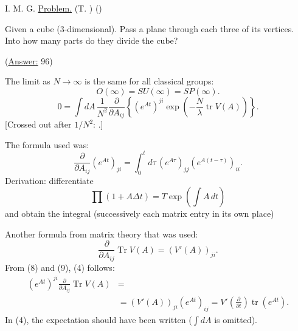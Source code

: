 I. M. G. \underline{Problem.}
(T. )
()

Given a cube (3-dimensional). Pass a plane through each three of its vertices. Into how many parts do they divide the cube?

(\underline{Answer:} 96)

The limit as $N\to\infty$ is the same for all classical groups:
\begin{equation*}
O(\infty)=SU(\infty)=SP(\infty). \tag{7}
\end{equation*}
\begin{equation*}
0=\int dA\,\frac1{N^2}\frac{\partial}{\partial A_{ij}}
\left\{(e^{At})^{ji}\exp\left(-\frac N\lambda\operatorname{tr}V(A)\right)\right\}. \tag{3'}
\end{equation*}
[Crossed out after $1/N^2$:
.]

The formula used was:
\begin{equation*}
\frac{\partial}{\partial A_{ij}}(e^{At})_{ji}
=\int_0^t d\tau\,(e^{A\tau})_{jj}(e^{A(t-\tau)})_{ii}. \tag{8}
\end{equation*}
Derivation: differentiate
\begin{equation*}
\prod(1+A\Delta t)=T\exp\left(\int A\,dt\right)
\end{equation*}
and obtain the integral (successively
each matrix entry in its own place)

Another formula from matrix theory that was used:
\begin{equation*}
\frac{\partial}{\partial A_{ij}}\operatorname{Tr}V(A)=(V'(A))_{ji}. \tag{9}
\end{equation*}
From (8) and (9), (4) follows:
\begin{equation*}
\begin{aligned}
(e^{At})^{ji}\frac{\partial}{\partial A_{ij}}\operatorname{Tr}V(A)
&={}\\
&=(V'(A))_{ji}(e^{At})_{ij}
=V'\left(\frac{\partial}{\partial t}\right)\operatorname{tr}(e^{At}).
\end{aligned}
\end{equation*}
In (4), the expectation should have been written ($\int dA$ is omitted).

